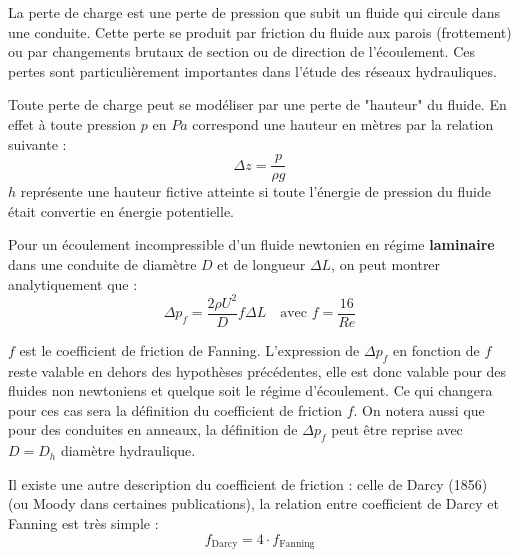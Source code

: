 La perte de charge est une perte de pression que subit un fluide qui circule dans une conduite. Cette perte se produit par friction du fluide aux parois (frottement) ou par changements brutaux de section ou de direction de l'écoulement. Ces pertes sont particulièrement importantes dans l'étude des réseaux hydrauliques.

Toute perte de charge peut se modéliser par une perte de "hauteur" du fluide. En effet à toute pression $p$ en $Pa$ correspond une hauteur en mètres par la relation suivante :
%
\begin{equation}
\Delta z = \frac{p}{\rho g}
\end{equation}
%
$h$ représente une hauteur fictive atteinte si toute l'énergie de pression du fluide était convertie en énergie potentielle.
%
\begin{center}
\end{center}
%
Pour un écoulement incompressible d'un fluide newtonien en régime \textbf{laminaire} dans une conduite de diamètre $D$ et de longueur $\Delta L$, on peut montrer analytiquement que :
%
\begin{equation}
\Delta p_f = \frac{2\rho U^2}{D} f \Delta L \quad\text{avec } f = \frac{16}{Re}
\end{equation}

$f$ est le coefficient de friction de Fanning. L'expression de $\Delta p_f$ en fonction de $f$ reste valable en dehors des hypothèses précédentes, elle est donc valable pour des fluides non newtoniens et quelque soit le régime d'écoulement. Ce qui changera pour ces cas sera la définition du coefficient de friction $f$. On notera aussi que pour des conduites en anneaux, la définition de $\Delta p_f$ peut être reprise avec $D = D_h$ diamètre hydraulique.

Il existe une autre description du coefficient de friction : celle de Darcy (1856) (ou Moody dans certaines publications), la relation entre coefficient de Darcy et Fanning est très simple :
%
\begin{equation}
f_{\text{Darcy}} = 4\cdot f_{\text{Fanning}}
\end{equation}


